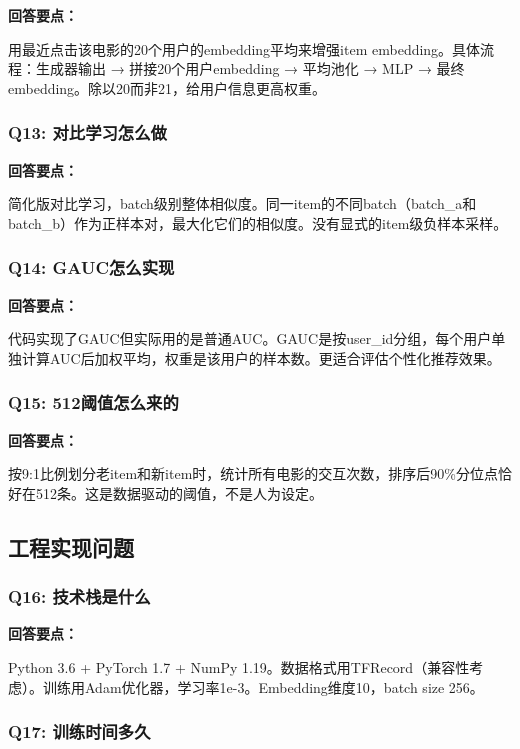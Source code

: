 \documentclass[12pt,a4paper]{article}
\begin{document}
\textbf{回答要点：}

用最近点击该电影的20个用户的embedding平均来增强item embedding。具体流程：生成器输出 → 拼接20个用户embedding → 平均池化 → MLP → 最终embedding。除以20而非21，给用户信息更高权重。

\subsubsection{Q13: 对比学习怎么做}

\textbf{回答要点：}

简化版对比学习，batch级别整体相似度。同一item的不同batch（batch\_a和batch\_b）作为正样本对，最大化它们的相似度。没有显式的item级负样本采样。

\subsubsection{Q14: GAUC怎么实现}

\textbf{回答要点：}

代码实现了GAUC但实际用的是普通AUC。GAUC是按user\_id分组，每个用户单独计算AUC后加权平均，权重是该用户的样本数。更适合评估个性化推荐效果。

\subsubsection{Q15: 512阈值怎么来的}

\textbf{回答要点：}

按9:1比例划分老item和新item时，统计所有电影的交互次数，排序后90\%分位点恰好在512条。这是数据驱动的阈值，不是人为设定。

\subsection{工程实现问题}

\subsubsection{Q16: 技术栈是什么}

\textbf{回答要点：}

Python 3.6 + PyTorch 1.7 + NumPy 1.19。数据格式用TFRecord（兼容性考虑）。训练用Adam优化器，学习率1e-3。Embedding维度10，batch size 256。

\subsubsection{Q17: 训练时间多久}
\end{document}
